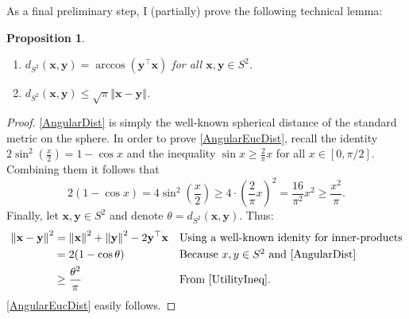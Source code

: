 \documentclass[a4paper,11pt]{scrartcl}
\newcounter{dummy}
\numberwithin{dummy}{section}
\theoremstyle{plain}
\newtheorem{proposition}[dummy]{Proposition}
\theoremstyle{plain}
\theoremstyle{plain}
\theoremstyle{plain}
\theoremstyle{nonumberplain}
\newtheorem{proof}{Proof}
\newcommand{\Ltwonorm}[1]{\left\Vert #1 \right\Vert} %
\begin{document}
	As a final preliminary step, I (partially) prove the following technical lemma:
	\begin{proposition}
		\label{LipschitzStuff}
		\begin{enumerate}[label=(\roman*)]
%			
			\item \label{AngularDist} $ d_{S^{2}} (\mathbf{x}, \mathbf{y}) = \arccos \left( \mathbf{y}^{\top} \mathbf{x} \right) $ for all $ \mathbf{x}, \mathbf{y} \in S^{2} $.
			
			\item \label{AngularEucDist} $ d_{S^{2}} (\mathbf{x}, \mathbf{y}) 
			\le \sqrt{\pi} \Ltwonorm{\mathbf{x} - \mathbf{y}} $.
			
		\end{enumerate}
	\end{proposition}
	
	\begin{proof}
		\ref{AngularDist} is simply the well-known spherical distance of the standard metric on the sphere. In order to prove \ref{AngularEucDist}, recall the identity $ 2 \sin^{2} \left( \frac{x}{2} \right) = 1 - \cos x $ and the inequality $ \sin x \ge \frac{2}{\pi} x $ for all $ x \in [0,\pi/2] $. Combining them it follows that
		\begin{equation}
		\label{UtilityIneq}
		2 (1 - \cos x)
		= 4 \sin^{2} \left( \frac{x}{2} \right) 
		\ge 4 \cdot \left( \frac{2}{\pi} x \right)^{2}
		= \frac{16}{\pi^2} x^{2}
		\ge \frac{x^{2}}{\pi}.
		\end{equation}
		Finally, let $ \mathbf{x}, \mathbf{y} \in S^{2} $ and denote $ \theta = d_{S^{2}} (\mathbf{x}, \mathbf{y}) $. Thus:
		\begin{align*}
		\Ltwonorm{\mathbf{x} - \mathbf{y}}^{2} 
		&= \Ltwonorm{\mathbf{x}}^{2} + \Ltwonorm{\mathbf{y}}^{2} - 2 \mathbf{y}^{\top} \mathbf{x} && \mbox{Using a well-known idenity for inner-products} \\
		&= 2 (1 - \cos \theta) && \mbox{Because $ x, y\in S^{2} $ and \ref{AngularDist}} \\
		&\ge \frac{\theta^{2}}{\pi}  && \mbox{From \eqref{UtilityIneq}.}
		\end{align*}
		\ref{AngularEucDist} easily follows.
	\end{proof}
	
\end{document}
